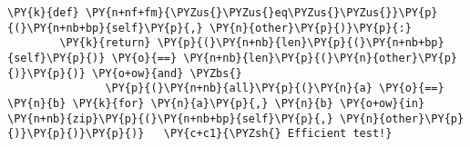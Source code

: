 \begin{Verbatim}[label=\makebox{\url{https://github.com/lucabaldini/cmepda/tree/master/slides/latex/snippets/vector\_ducked.py}},commandchars=\\\{\}]
    \PY{k}{def} \PY{n+nf+fm}{\PYZus{}\PYZus{}eq\PYZus{}\PYZus{}}\PY{p}{(}\PY{n+nb+bp}{self}\PY{p}{,} \PY{n}{other}\PY{p}{)}\PY{p}{:}
        \PY{k}{return} \PY{p}{(}\PY{n+nb}{len}\PY{p}{(}\PY{n+nb+bp}{self}\PY{p}{)} \PY{o}{==} \PY{n+nb}{len}\PY{p}{(}\PY{n}{other}\PY{p}{)}\PY{p}{)} \PY{o+ow}{and} \PYZbs{}
               \PY{p}{(}\PY{n+nb}{all}\PY{p}{(}\PY{n}{a} \PY{o}{==} \PY{n}{b} \PY{k}{for} \PY{n}{a}\PY{p}{,} \PY{n}{b} \PY{o+ow}{in} \PY{n+nb}{zip}\PY{p}{(}\PY{n+nb+bp}{self}\PY{p}{,} \PY{n}{other}\PY{p}{)}\PY{p}{)}\PY{p}{)}   \PY{c+c1}{\PYZsh{} Efficient test!}
\end{Verbatim}